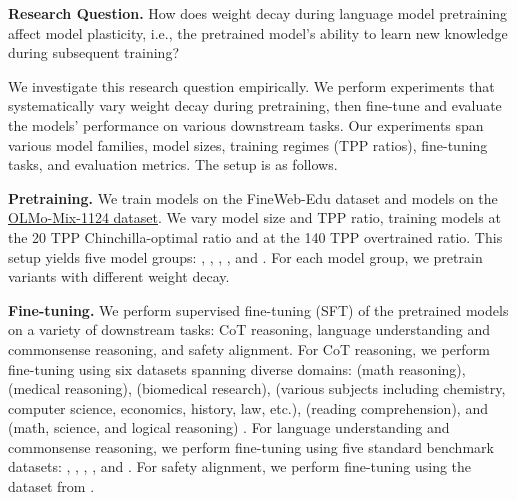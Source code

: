 \begin{finding} 
\textbf{Research Question.} How does weight decay during language model pretraining affect model plasticity, i.e., the pretrained model's ability to learn new knowledge during subsequent training?
\end{finding}

We investigate this research question empirically. We perform experiments that systematically vary weight decay during pretraining, then fine-tune and evaluate the models' performance on various downstream tasks. 
Our experiments span various model families, model sizes, training regimes (TPP ratios), fine-tuning tasks, and evaluation metrics. The setup is as follows.

\textbf{Pretraining.} We train \llama{} models on the FineWeb-Edu dataset \citep{penedo2024fineweb} and \olmo{} models on the \href{https://huggingface.co/datasets/allenai/olmo-mix-1124}{OLMo-Mix-1124 dataset}. We vary model size and TPP ratio, training models at the 20 TPP Chinchilla-optimal ratio \citep{hoffmann2022training} and at the 140 TPP overtrained ratio.
This setup yields five model groups: \llamazeropointfiveB{}, \llamaoneB{}, \llamafourB{}, \olmoonex{}, and \olmosevenx{}.
For each model group, we pretrain variants with different weight decay.



\textbf{Fine-tuning.} We perform supervised fine-tuning (SFT) of the pretrained models on a variety of downstream tasks: CoT reasoning, language understanding and commonsense reasoning, and safety alignment.
For CoT reasoning, we perform fine-tuning using six datasets spanning diverse domains: \metamathqa{} (math reasoning), \medmcqa{} (medical reasoning), \pubmedqa{} (biomedical research), \mmluprocot{} (various subjects including chemistry, computer science, economics, history, law, etc.), \race{} (reading comprehension), and \simplescaling{} (math, science, and logical reasoning) \citep{yu2023metamathqa, pal2022medmcqa, jin2019pubmedqa, wang2024mmlupro, mmluprocot2025, lai2017race, muennighoff2025s1}.
For language understanding and commonsense reasoning, we perform fine-tuning using five standard benchmark datasets: \hellaswag{}, \winogrande{}, \piqa{}, \arceasy{}, and \arcchallenge{} \citep{zellers2019hellaswag, sakaguchi2021winogrande,bisk2020piqa,clark2018think}.
For safety alignment, we perform fine-tuning using the dataset from \citet{bianchi2024safety}.






